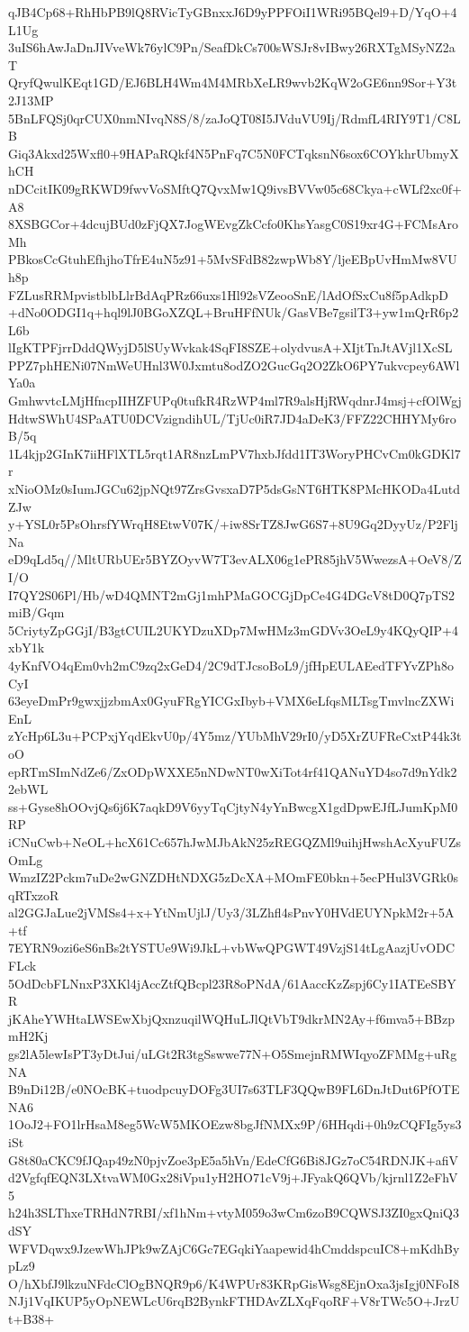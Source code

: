 qJB4Cp68+RhHbPB9lQ8RVicTyGBnxxJ6D9yPPFOiI1WRi95BQel9+D/YqO+4L1Ug
3uIS6hAwJaDnJIVveWk76ylC9Pn/SeafDkCs700sWSJr8vIBwy26RXTgMSyNZ2aT
QryfQwulKEqt1GD/EJ6BLH4Wm4M4MRbXeLR9wvb2KqW2oGE6nn9Sor+Y3t2J13MP
5BnLFQSj0qrCUX0nmNIvqN8S/8/zaJoQT08I5JVduVU9Ij/RdmfL4RIY9T1/C8LB
Giq3Akxd25Wxfl0+9HAPaRQkf4N5PnFq7C5N0FCTqksnN6sox6COYkhrUbmyXhCH
nDCcitIK09gRKWD9fwvVoSMftQ7QvxMw1Q9ivsBVVw05c68Ckya+cWLf2xc0f+A8
8XSBGCor+4dcujBUd0zFjQX7JogWEvgZkCcfo0KhsYasgC0S19xr4G+FCMsAroMh
PBkosCcGtuhEfhjhoTfrE4uN5z91+5MvSFdB82zwpWb8Y/ljeEBpUvHmMw8VUh8p
FZLusRRMpvistblbLlrBdAqPRz66uxs1Hl92sVZeooSnE/lAdOfSxCu8f5pAdkpD
+dNo0ODGI1q+hql9lJ0BGoXZQL+BruHFfNUk/GasVBe7gsilT3+yw1mQrR6p2L6b
lIgKTPFjrrDddQWyjD5lSUyWvkak4SqFI8SZE+olydvusA+XIjtTnJtAVjl1XcSL
PPZ7phHENi07NmWeUHnl3W0Jxmtu8odZO2GucGq2O2ZkO6PY7ukvcpey6AWlYa0a
GmhwvtcLMjHfncpIIHZFUPq0tufkR4RzWP4ml7R9alsHjRWqdnrJ4msj+cfOlWgj
HdtwSWhU4SPaATU0DCVzigndihUL/TjUc0iR7JD4aDeK3/FFZ22CHHYMy6roB/5q
1L4kjp2GInK7iiHFlXTL5rqt1AR8nzLmPV7hxbJfdd1IT3WoryPHCvCm0kGDKl7r
xNioOMz0sIumJGCu62jpNQt97ZrsGvsxaD7P5dsGsNT6HTK8PMcHKODa4LutdZJw
y+YSL0r5PsOhrsfYWrqH8EtwV07K/+iw8SrTZ8JwG6S7+8U9Gq2DyyUz/P2FljNa
eD9qLd5q//MltURbUEr5BYZOyvW7T3evALX06g1ePR85jhV5WwezsA+OeV8/ZI/O
I7QY2S06Pl/Hb/wD4QMNT2mGj1mhPMaGOCGjDpCe4G4DGcV8tD0Q7pTS2miB/Gqm
5CriytyZpGGjI/B3gtCUIL2UKYDzuXDp7MwHMz3mGDVv3OeL9y4KQyQIP+4xbY1k
4yKnfVO4qEm0vh2mC9zq2xGeD4/2C9dTJcsoBoL9/jfHpEULAEedTFYvZPh8oCyI
63eyeDmPr9gwxjjzbmAx0GyuFRgYICGxIbyb+VMX6eLfqsMLTsgTmvlncZXWiEnL
zYcHp6L3u+PCPxjYqdEkvU0p/4Y5mz/YUbMhV29rI0/yD5XrZUFReCxtP44k3toO
epRTmSImNdZe6/ZxODpWXXE5nNDwNT0wXiTot4rf41QANuYD4so7d9nYdk22ebWL
ss+Gyse8hOOvjQs6j6K7aqkD9V6yyTqCjtyN4yYnBwcgX1gdDpwEJfLJumKpM0RP
iCNuCwb+NeOL+hcX61Cc657hJwMJbAkN25zREGQZMl9uihjHwshAcXyuFUZsOmLg
WmzIZ2Pckm7uDe2wGNZDHtNDXG5zDcXA+MOmFE0bkn+5ecPHul3VGRk0sqRTxzoR
al2GGJaLue2jVMSs4+x+YtNmUjlJ/Uy3/3LZhfl4sPnvY0HVdEUYNpkM2r+5A+tf
7EYRN9ozi6eS6nBs2tYSTUe9Wi9JkL+vbWwQPGWT49VzjS14tLgAazjUvODCFLck
5OdDcbFLNnxP3XKl4jAccZtfQBcpl23R8oPNdA/61AaccKzZspj6Cy1IATEeSBYR
jKAheYWHtaLWSEwXbjQxnzuqilWQHuLJlQtVbT9dkrMN2Ay+f6mva5+BBzpmH2Kj
gs2lA5lewIsPT3yDtJui/uLGt2R3tgSswwe77N+O5SmejnRMWIqyoZFMMg+uRgNA
B9nDi12B/e0NOcBK+tuodpcuyDOFg3UI7s63TLF3QQwB9FL6DnJtDut6PfOTENA6
1OoJ2+FO1lrHsaM8eg5WcW5MKOEzw8bgJfNMXx9P/6HHqdi+0h9zCQFIg5ys3iSt
G8t80aCKC9fJQap49zN0pjvZoe3pE5a5hVn/EdeCfG6Bi8JGz7oC54RDNJK+afiV
d2VgfqfEQN3LXtvaWM0Gx28iVpu1yH2HO71cV9j+JFyakQ6QVb/kjrnl1Z2eFhV5
h24h3SLThxeTRHdN7RBI/xf1hNm+vtyM059o3wCm6zoB9CQWSJ3ZI0gxQniQ3dSY
WFVDqwx9JzewWhJPk9wZAjC6Gc7EGqkiYaapewid4hCmddspcuIC8+mKdhBypLz9
O/hXbfJ9lkzuNFdcClOgBNQR9p6/K4WPUr83KRpGisWsg8EjnOxa3jsIgj0NFoI8
NJj1VqIKUP5yOpNEWLcU6rqB2BynkFTHDAvZLXqFqoRF+V8rTWc5O+JrzUt+B38+
